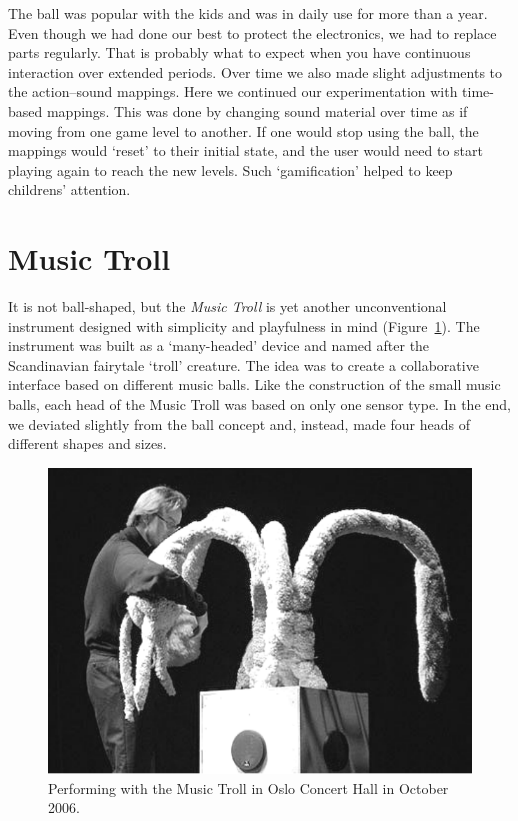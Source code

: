 The ball was popular with the kids and was in daily use for more than a year. Even though we had done our best to protect the electronics, we had to replace parts regularly. That is probably what to expect when you have continuous interaction over extended periods. Over time we also made slight adjustments to the action--sound mappings. Here we continued our experimentation with time-based mappings. This was done by changing sound material over time as if moving from one game level to another. If one would stop using the ball, the mappings would `reset' to their initial state, and the user would need to start playing again to reach the new levels. Such `gamification' helped to keep childrens' attention.


\section{Music Troll}

It is not ball-shaped, but the \emph{Music Troll} is yet another unconventional instrument designed with simplicity and playfulness in mind (Figure~\ref{fig:figures_music-troll_arj-troll}). The instrument was built as a `many-headed' device and named after the Scandinavian fairytale `troll' creature.
The idea was to create a collaborative interface based on different music balls. Like the construction of the small music balls, each head of the Music Troll was based on only one sensor type. In the end, we deviated slightly from the ball concept and, instead, made four heads of different shapes and sizes.

\begin{figure}[tbp]
	\centering
		\includegraphics[width=\columnwidth]{figures/69-music-troll-crop.pdf}
	\caption{Performing with the Music Troll in Oslo Concert Hall in October 2006.}
	\label{fig:figures_music-troll_arj-troll}
\end{figure}

